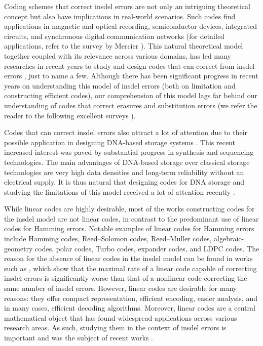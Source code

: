 \documentclass[11pt]{article}
\theoremstyle{plain}
\theoremstyle{definition}
\theoremstyle{remark}
\begin{document}
Coding schemes that correct insdel errors are not only an intriguing theoretical concept but also have implications in real-world scenarios. Such codes find applications in magnetic and optical recording, semiconductor devices, integrated circuits, and synchronous digital communication networks (for detailed applications, refer to the survey by Mercier \cite{mercier2010survey}).
This natural theoretical model together coupled with its 
relevance across various domains, has led many researches in recent years to study and design codes that can correct from insdel errors \cite{bukh2016improved,haeupler2021synchronization-org,brakensiek2017efficient,guruswami2017deletion,schoeny2017codes,cheng2018deterministic,haeupler2019optimal,cheng2020efficient,guruswami2021explicit,guruswami2022zero}, just to name a few. 
Although there has been significant progress in recent years on understanding this model of insdel errors (both on limitation and constructing efficient codes), our comprehension of this model lags far behind our understanding of codes that correct erasures and substitution errors (we refer the reader to the following excellent surveys \cite{mitzenmacher2009survey,mercier2010survey,cheraghchi2020overview,haeupler2021synchronization}).
	
    Codes that can correct insdel errors also attract a lot of attention due to their possible application in designing DNA-based storage systems \cite{goldman2013towards}. This recent increased interest was paved by substantial progress in synthesis and sequencing technologies. The main advantages of DNA-based storage over classical
storage technologies are very high data densities and long-term reliability without an electrical supply. It is thus natural that designing codes for DNA storage and studying the limitations of this model received a lot of attention recently \cite{heckel2017fundamental,lenz2019coding,heckel2019characterization,shomorony2022information}.

    While linear codes are highly desirable, most of the works constructing codes for the insdel model are not linear codes, in contrast to the predominant use of linear codes for Hamming errors. Notable examples of linear codes for Hamming errors include Hamming codes, Reed–Solomon codes, Reed–Muller codes, algebraic-geometry codes, polar codes, Turbo codes, expander codes, and LDPC codes.
    The reason for the absence of linear codes in the insdel model can be found in works such as \cite{abdel2007linear, cheng2020efficient}, which show that the maximal rate of a linear code capable of correcting insdel errors is significantly worse than that of a nonlinear code correcting the same number of insdel errors.
    However, linear codes are desirable for many reasons: they offer compact representation, efficient encoding, easier analysis, and in many cases, efficient decoding algorithms.
    Moreover, linear codes are a central mathematical object that has found widespread applications across various research areas. As such, studying them in the context of insdel errors is important and was the subject of recent works \cite{cheng2020efficient,chen2022coordinate,con2022explicit,con2023reed,ji2023strict,cheng2023linear,liu2024optimal}.
\end{document}
